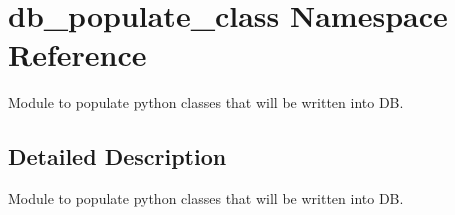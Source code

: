 \hypertarget{namespacedb__populate__class}{\section{db\-\_\-populate\-\_\-class Namespace Reference}
\label{namespacedb__populate__class}
}


Module to populate python classes that will be written into D\-B.  




\subsection{Detailed Description}
Module to populate python classes that will be written into D\-B. 